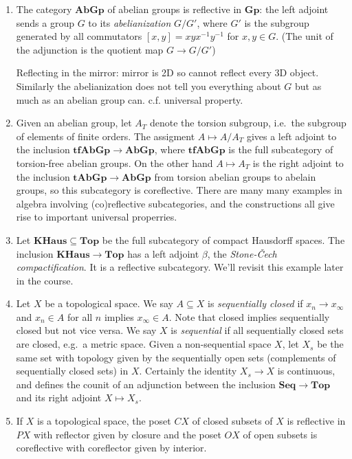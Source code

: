 \documentclass[a4paper]{article}
\renewcommand{\c}[1]{\mathbf{#1}}
\newcommand{\Top}{{\c{Top}}}
\begin{document}
\begin{eg}\leavevmode
  \begin{enumerate}
  \item The category \(\c{AbGp}\) of abelian groups is reflective in \(\c{Gp}\): the left adjoint sends a group \(G\) to its \emph{abelianization} \(G/G'\), where \(G'\) is the subgroup generated by all commutators \([x, y] = xyx^{-1}y^{-1}\) for \(x, y \in G\). (The unit of the adjunction is the quotient map \(G \to G/G'\))

    Reflecting in the mirror: mirror is 2D so cannot reflect every 3D object. Similarly the abelianization does not tell you everything about \(G\) but as much as an abelian group can. c.f. universal property.
  \item Given an abelian group, let \(A_T\) denote the torsion subgroup, i.e.\ the subgroup of elements of finite orders. The assigment \(A \mapsto A/A_T\) gives a left adjoint to the inclusion \(\c{tfAbGp} \to \c{AbGp}\), where \(\c{tfAbGp}\) is the full subcategory of torsion-free abelian groups. On the other hand \(A \mapsto A_T\) is the right adjoint to the inclusion \(\c{tAbGp} \to \c{AbGp}\) from torsion abelian groups to abelain groups, so this subcategory is coreflective. There are many many examples in algebra involving (co)reflective subcategories, and the constructions all give rise to important universal properries.
  \item Let \(\c{KHaus} \subseteq \Top\) be the full subcategory of compact Hausdorff spaces. The inclusion \(\c{KHaus} \to \Top\) has a left adjoint \(\beta\), the \emph{Stone-Čech compactification}. It is a reflective subcategory. We'll revisit this example later in the course.
  \item Let \(X\) be a topological space. We say \(A\subseteq X\) is \emph{sequentially closed} if \(x_n \to x_\infty\) and \(x_n \in A\) for all \(n\) implies \(x_\infty \in A\). Note that closed implies sequentially closed but not vice versa. We say \(X\) is \emph{sequential} if all sequentially closed sets are closed, e.g.\ a metric space. Given a non-sequential space \(X\), let \(X_s\) be the same set with topology given by the sequentially open sets (complements of sequentially closed sets) in \(X\). Certainly the identity \(X_s \to X\) is continuous, and defines the counit of an adjunction between the inclusion \(\c{Seq} \to \c{Top}\) and its right adjoint \(X \mapsto X_s\).
  \item If \(X\) is a topological space, the poset \(CX\) of closed subsets of \(X\) is reflective in \(PX\) with reflector given by closure and the poset \(OX\) of open subsets is coreflective with coreflector given by interior.
  \end{enumerate}
\end{eg}
\end{document}
